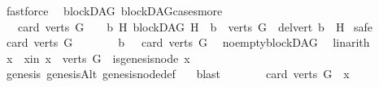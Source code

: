 \begin{isabellebody}
\ fastforce\isanewline
{}\isamarkupfalse%
%
\endisatagproof
{\isafoldproof}%
%
\isadelimproof
\isanewline
%
\endisadelimproof
\isanewline
{}\isamarkupfalse%
\ {\isacharparenleft}{\kern0pt}\ blockDAG{\isacharparenright}{\kern0pt}\ blockDAG{\isacharunderscore}{\kern0pt}cases{\isacharunderscore}{\kern0pt}more{\isacharcolon}{\kern0pt}\isanewline
\ \ \ {\isachardoublequoteopen}card\ {\isacharparenleft}{\kern0pt}verts\ G{\isacharparenright}{\kern0pt}\ {\isachargreater}{\kern0pt}\ {}\ {\isasymlongleftrightarrow}\ {\isacharparenleft}{\kern0pt}{\isasymexists}b\ H{\isachardot}{\kern0pt}\ {\isacharparenleft}{\kern0pt}blockDAG\ H\ {\isasymand}\ b\ {\isasymin}\ verts\ G\ {\isasymand}\ del{\isacharunderscore}{\kern0pt}vert\ b\ {\isacharequal}{\kern0pt}\ H{\isacharparenright}{\kern0pt}{\isacharparenright}{\kern0pt}{\isachardoublequoteclose}\isanewline
%
\isadelimproof
%
\endisadelimproof
%
\isatagproof
{}\isamarkupfalse%
\ safe\isanewline
\ \ \isamarkupfalse%
\ {\isachardoublequoteopen}card\ {\isacharparenleft}{\kern0pt}verts\ G{\isacharparenright}{\kern0pt}\ {\isachargreater}{\kern0pt}\ {}{\isachardoublequoteclose}\isanewline
\ \ \isamarkupfalse%
\ \isamarkupfalse%
\ b{}{\isacharcolon}{\kern0pt}\ {\isachardoublequoteopen}{}\ {\isacharless}{\kern0pt}\ card\ {\isacharparenleft}{\kern0pt}verts\ G{\isacharparenright}{\kern0pt}{\isachardoublequoteclose}\ \isamarkupfalse%
\ no{\isacharunderscore}{\kern0pt}empty{\isacharunderscore}{\kern0pt}blockDAG\ \isamarkupfalse%
\ linarith\isanewline
\ \ \isamarkupfalse%
\ x\ \ x{\isacharunderscore}{\kern0pt}in{\isacharcolon}{\kern0pt}\ {\isachardoublequoteopen}x\ {\isasymin}\ {\isacharparenleft}{\kern0pt}verts\ G{\isacharparenright}{\kern0pt}\ {\isasymand}\ is{\isacharunderscore}{\kern0pt}genesis{\isacharunderscore}{\kern0pt}node\ x{\isachardoublequoteclose}\ \isanewline
\ \ \ \ \isamarkupfalse%
\ genesis\ genesisAlt\ genesis{\isacharunderscore}{\kern0pt}node{\isacharunderscore}{\kern0pt}def\ \ \isamarkupfalse%
\ blast\isanewline
\ \ \isamarkupfalse%
\ \isamarkupfalse%
\ {\isachardoublequoteopen}{}\ {\isacharless}{\kern0pt}\ card\ {\isacharparenleft}{\kern0pt}{\isacharparenleft}{\kern0pt}verts\ G{\isacharparenright}{\kern0pt}\ {\isacharminus}{\kern0pt}\ {\isacharbraceleft}{\kern0pt}x{\isacharbraceright}{\kern0pt}{\isacharparenright}{\kern0pt}{\isachardoublequoteclose}\ \isamarkupfalse%

\end{isabellebody}
